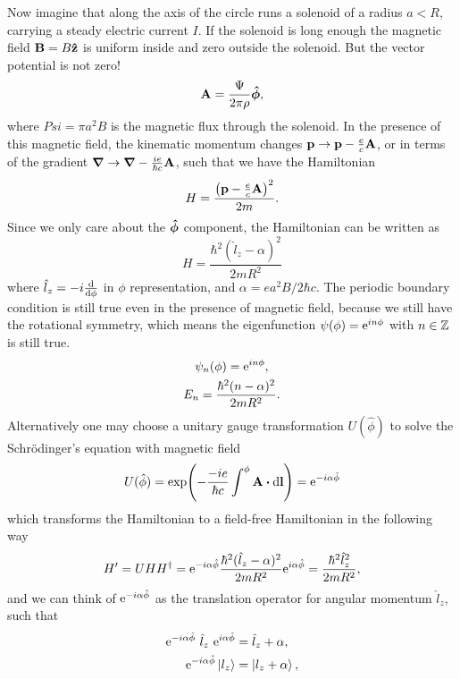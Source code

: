 \documentclass[10pt]{article}
\begin{document}
	Now imagine that along the axis of the circle runs a solenoid of a radius $a < R$, carrying a steady electric current $I$. If the solenoid is long enough the magnetic field ${\bf B} = B \vu{z}$ is uniform inside and zero outside the solenoid. But the vector potential is not zero!
	\begin{equation}
		{\bf A} = \frac{\Psi}{2 \pi \rho} \vu*{\phi},
	\end{equation}
	where $Psi = \pi a^2 B$ is the magnetic flux through the solenoid. In the presence of this magnetic field, the kinematic momentum changes ${\bf p} \to {\bf p} - \frac{e}{c} {\bf A}$, or in terms of the gradient $\grad \to \grad - \tfrac{ie}{\hbar c} {\bf A}$, such that we have the Hamiltonian
	\begin{equation}
		H = \frac{\qty({\bf p} - \frac{e}{c}{\bf A})^2}{2m}.
	\end{equation}
	Since we only care about the $\vu*{\phi}$ component, the Hamiltonian can be written as
	\begin{equation}
		H = \frac{\hbar^2(\hat{l}_z-\alpha)^2}{2mR^2}
	\end{equation}
	where $\hat{l}_z = -i \dv{\phi}$ in $\phi$ representation, and $\alpha = ea^2B/2\hbar c$. The periodic boundary condition is still true even in the presence of magnetic field, because we still have the rotational symmetry, which means the eigenfunction $\psi(\phi) = {\mathrm{e}}^{i n \phi}$ with $n \in {\mathbb{Z}}$ is still true.
	\begin{gather}
		\psi_n(\phi) = {\mathrm{e}}^{i n \phi}, \\
		E_n = \frac{\hbar^2 (n- \alpha)^2}{2mR^2}.
	\end{gather}
	Alternatively one may choose a unitary gauge transformation $U(\hat{\phi})$ to solve the Schr\"{o}dinger's equation with magnetic field
	\begin{equation}
		U(\hat{\phi}) = \exp(-\frac{-i e}{\hbar c}\int^\phi \bfA \vdot \dd \bfl) = \e^{-i \alpha \hat{\phi}}
	\end{equation}
	which transforms the Hamiltonian to a field-free Hamiltonian in the following way
	\begin{equation}
		H' = U H H^{\dagger} = {\mathrm{e}}^{-i \alpha \hat{\phi}} \frac{\hbar^2(\hat{l}_z-\alpha)^2}{2mR^2} {\mathrm{e}}^{i \alpha \hat{\phi}} = \frac{\hbar^2 \hat{l}_z^2}{2mR^2},
	\end{equation}
	and we can think of ${\mathrm{e}}^{-i \alpha \hat{\phi}}$ as the translation operator for angular momentum $\hat{l}_z$, such that
	\begin{align}
		{\mathrm{e}}^{-i \alpha \hat{\phi}} \ \hat{l}_z \ {\mathrm{e}}^{i \alpha \hat{\phi}} &= \hat{l}_z + \alpha, \\
		{\mathrm{e}}^{-i \alpha \hat{\phi}} \ket{l_z} &= \ket{l_z + \alpha},
	\end{align}
\end{document}
